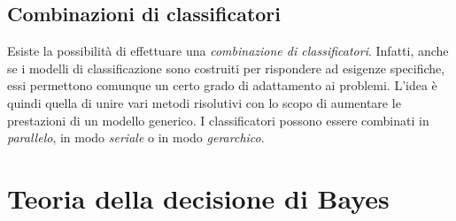 \documentclass[a4paper,oneside,titlepage]{book}
\begin{document}
\section{Combinazioni di classificatori}
Esiste la possibilità di effettuare una \textit{combinazione di classificatori}. Infatti, anche se i modelli di classificazione sono costruiti per rispondere ad esigenze specifiche, essi permettono comunque un certo grado di adattamento ai problemi. L'idea è quindi quella di unire vari metodi risolutivi con lo scopo di aumentare le prestazioni di un modello generico. I classificatori possono essere combinati in \textit{parallelo}, in modo \textit{seriale} o in modo \textit{gerarchico}.


\chapter{Teoria della decisione di Bayes}
\end{document}
